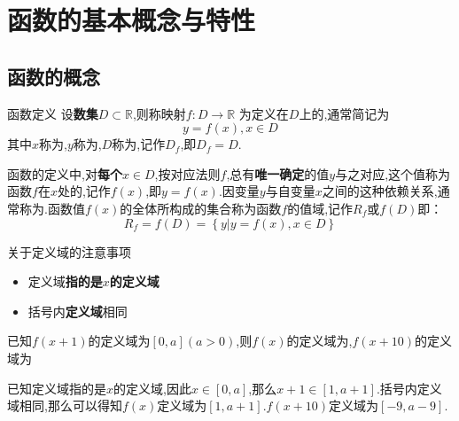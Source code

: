 \documentclass[8pt a4paper, oneside, UTF8]{ctexbook}  %
\begin{document}
\begin{sloppypar}
    \section{函数的基本概念与特性}
    \subsection{函数的概念}
    \begin{defn}{函数定义}{}
        设\textbf{数集}$D \subset \mathbb{R}$,则称映射$f:D \to \mathbb{R}$ 为定义在$D$上的,通常简记为
        $$
            y=f(x),x \in D
        $$
        其中$x$称为,$y$称为,$D$称为,记作$D_f$,即$D_f=D$.
    \end{defn}
    函数的定义中,对\textbf{每个}$x \in D$,按对应法则$f$,总有\textbf{唯一确定}的值$y$与之对应,这个值称为函数$f$在$x$处的,记作$f(x)$,即$y=f(x)$.因变量$y$与自变量$x$之间的这种依赖关系,通常称为.函数值$f(x)$的全体所构成的集合称为函数$f$的值域,记作$R_f$或$f(D)$即：
    $$
        R_{f}=f(D)=\left\{y|y=f(x),x\in D\right\}
    $$
    \begin{criterion}{关于定义域的注意事项}{}
        \begin{itemize}
            \item 定义域\textbf{指的是$x$的定义域}
            \item 括号内\textbf{定义域}相同
        \end{itemize}
    \end{criterion}
    \begin{problem}
    已知$f(x+1)$的定义域为$[0,a](a>0)$,则$f(x)$的定义域为,$f(x+10)$的定义域为
    \end{problem}
    \begin{solution}
        已知定义域指的是$x$的定义域,因此$x \in [0,a]$,那么$x+1 \in [1,a+1]$.括号内定义域相同,那么可以得知$f(x)$定义域为$[1,a+1]$.$f(x+10)$定义域为$[-9,a-9]$.
    \end{solution}

\end{sloppypar}
\end{document}
